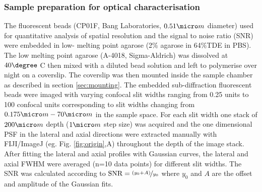 \documentclass[12pt]{spieman}  %
\begin{document}
\subsubsection{Sample preparation for optical characterisation}
The fluorescent beads (CP01F, Bang Laboratories, $0.51 \micro m$ diameter) used for quantitative analysis of spatial resolution and the signal to noise ratio (SNR) were embedded in low- melting point agarose (2\% agarose in 64\%TDE in PBS). The low melting point agarose (A-4018, Sigma-Aldrich) was dissolved at $40 \degree$ C then mixed with a diluted bead solution and left to polymerise over night on a coverslip. The coverslip was then mounted inside the sample chamber as described in section \ref{sec:mounting}. The embedded sub-diffraction fluorescent beads were imaged with varying confocal slit widths ranging from 0.25 units to 100 confocal units corresponding to slit widths changing from $0.175 \micro m-70 \micro m$ in the sample space. For each slit width one stack of $200\micro m$ depth ($1 \micro m$ step size) was acquired and the one dimensional PSF in the lateral and axial directions were extracted manually with FIJI/ImageJ (eg. Fig. \ref{fig:origin},A) throughout the depth of the image stack. After fitting the lateral and axial profiles with Gaussian curves, the lateral and axial FWHM were averaged (n=10 data points) for different slit widths. The SNR was calculated according to $\text{SNR} = \nicefrac{(y_0 + A)}{y_0}$ where $y_0$ and $A$ are the offset and amplitude of the Gaussian fits.
\end{document}
